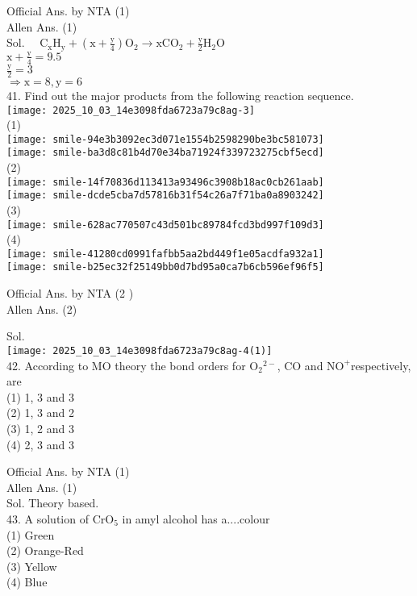 \documentclass[10pt]{article}
\begin{document}
Official Ans. by NTA (1)\\
Allen Ans. (1)\\
Sol. \(\quad \mathrm{C}_{\mathrm{x}} \mathrm{H}_{\mathrm{y}}+\left(\mathrm{x}+\frac{\mathrm{y}}{4}\right) \mathrm{O}_{2} \rightarrow \mathrm{xCO}_{2}+\frac{\mathrm{y}}{2} \mathrm{H}_{2} \mathrm{O}\)\\
\(\mathrm{x}+\frac{\mathrm{y}}{4}=9.5\)\\
\(\frac{\mathrm{y}}{2}=3\)\\
\(\Rightarrow \mathrm{x}=8, \mathrm{y}=6\)\\
41. Find out the major products from the following reaction sequence.\\
\texttt{[image: 2025\_10\_03\_14e3098fda6723a79c8ag-3]}\\
(1)\\
\texttt{[image: smile-94e3b3092ec3d071e1554b2598290be3bc581073]}\\
\texttt{[image: smile-ba3d8c81b4d70e34ba71924f339723275cbf5ecd]}\\
(2)\\
\texttt{[image: smile-14f70836d113413a93496c3908b18ac0cb261aab]}\\
\texttt{[image: smile-dcde5cba7d57816b31f54c26a7f71ba0a8903242]}\\
(3)\\
\texttt{[image: smile-628ac770507c43d501bc89784fcd3bd997f109d3]}\\
(4)\\
\texttt{[image: smile-41280cd0991fafbb5aa2bd449f1e05acdfa932a1]}\\
\texttt{[image: smile-b25ec32f25149bb0d7bd95a0ca7b6cb596ef96f5]}

Official Ans. by NTA (2 )\\
Allen Ans. (2)

Sol.\\
\texttt{[image: 2025\_10\_03\_14e3098fda6723a79c8ag-4(1)]}\\
42. According to MO theory the bond orders for \(\mathrm{O}_{2}{ }^{2-}\), CO and \(\mathrm{NO}^{+}\)respectively, are\\
(1) 1, 3 and 3\\
(2) 1, 3 and 2\\
(3) 1, 2 and 3\\
(4) 2, 3 and 3

Official Ans. by NTA (1)\\
Allen Ans. (1)\\
Sol. Theory based.\\
43. A solution of \(\mathrm{CrO}_{5}\) in amyl alcohol has a....colour\\
(1) Green\\
(2) Orange-Red\\
(3) Yellow\\
(4) Blue
\end{document}
